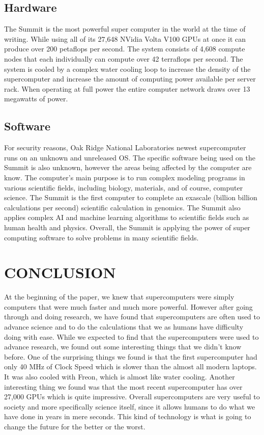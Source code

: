 \documentclass[letterpaper, 10 pt, conference]{IEEEconf}
\begin{document}
\subsection{Hardware}
The Summit is the most powerful super computer in the world at the time of writing. While using all of its 27,648 NVidia Volta V100 GPUs at once it can produce over 200 petaflops per second. The system consists of 4,608 compute nodes that each individually can compute over 42 terraflops per second. The system is cooled by a complex water cooling loop to increase the density of the supercomputer and increase the amount of computing power available per server rack. When operating at full power the entire computer network draws over 13 megawatts of power.
\subsection{Software}
For security reasons, Oak Ridge National Laboratories newest
supercomputer runs on an unknown and unreleased OS. The specific
software being used on the Summit is also unknown, however the
areas being affected by the computer are know. The computer's main
purpose is to run complex modeling programs in various scientific
fields, including biology, materials, and of course, computer
science. The Summit is the first computer to complete an exascale
(billion billion calculations per second) scientific calculation
in genomics. The Summit also applies complex AI and machine
learning algorithms to scientific fields such as human health and
physics. Overall, the Summit is applying the power of super
computing software to solve problems in many scientific fields.


\section{CONCLUSION}
At the beginning of the paper, we knew that supercomputers were simply computers that were much faster and much more powerful. However after going through and doing research, we have found that supercomputers are often used to advance science and to do the calculations that we as humans have difficulty doing with ease. While we expected to find that the supercomputers were used to advance research, we found out some interesting things that we didn't know before. One of the surprising things we found is that the first supercomputer had only 40 MHz of Clock Speed which is slower than the almost all modern laptops. It was also cooled with Freon, which is almost like water cooling. Another interesting thing we found was that the most recent supercomputer has over 27,000 GPUs which is quite impressive. Overall supercomputers are very useful to society and more specifically science itself, since it allows humans to do what we have done in years in mere seconds. This kind of technology is what is going to change the future for the better or the worst.
\end{document}

